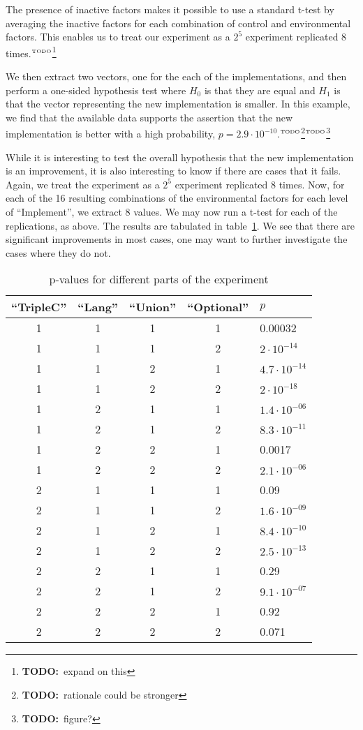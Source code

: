 \documentclass{llncs}
\newcommand{\todo}[1]{\ensuremath{^{\textrm{\tiny{TODO}\normalsize}}}\footnote{\textbf{TODO:}~#1}}
\begin{document}
The presence of inactive factors makes it possible to use a standard
t-test by averaging the inactive factors for each combination of
control and environmental factors. This enables us to treat our
experiment as a $2^5$ experiment replicated 8 times.\todo{expand on this}

We then extract two vectors, one for the each of the implementations,
and then perform a one-sided hypothesis test where $H_0$ is that they
are equal and $H_1$ is that the vector representing the new
implementation is smaller. In this example, we find that the available
data supports the assertion that the new implementation is better with a
high probability, $p=2.9 \cdot 10^{-10}$.\todo{rationale could be
  stronger}\todo{figure?}

While it is interesting to test the overall hypothesis that the new
implementation is an improvement, it is also interesting to know if
there are cases that it fails. Again, we treat the experiment as a
$2^5$ experiment replicated 8 times. Now, for each of the 16 resulting
combinations of the environmental factors for each level of
``Implement'', we extract 8 values. We may now run a t-test for each
of the replications, as above. The results are tabulated in
table~\ref{tab:pvaluesfull}. We see that there are significant
improvements in most cases, one may want to further investigate the
cases where they do not.

\begin{table}[ht]
\begin{center}
\caption{p-values for different parts of the experiment}\label{tab:pvaluesfull}
\begin{tabular}{ccccl}
  \hline
``TripleC'' & ``Lang'' & ``Union'' & ``Optional'' & $p$ \\ 
  \hline
  1 & 1 & 1 & 1 & 0.00032 \\ 
  1 & 1 & 1 & 2 & $2 \cdot 10^{-14}$ \\ 
  1 & 1 & 2 & 1 & $4.7 \cdot 10^{-14}$ \\ 
  1 & 1 & 2 & 2 & $2 \cdot 10^{-18}$ \\ 
  1 & 2 & 1 & 1 & $1.4 \cdot 10^{-06}$ \\ 
  1 & 2 & 1 & 2 & $8.3 \cdot 10^{-11}$ \\ 
  1 & 2 & 2 & 1 & 0.0017 \\ 
  1 & 2 & 2 & 2 & $2.1 \cdot 10^{-06}$ \\ 
  2 & 1 & 1 & 1 & 0.09 \\ 
  2 & 1 & 1 & 2 & $1.6 \cdot 10^{-09}$ \\ 
  2 & 1 & 2 & 1 & $8.4 \cdot 10^{-10}$ \\ 
  2 & 1 & 2 & 2 & $2.5 \cdot 10^{-13}$ \\ 
  2 & 2 & 1 & 1 & 0.29 \\ 
  2 & 2 & 1 & 2 & $9.1 \cdot 10^{-07}$ \\ 
  2 & 2 & 2 & 1 & 0.92 \\ 
  2 & 2 & 2 & 2 & 0.071 \\ 
   \hline
\end{tabular}
\end{center}
\end{table}
\end{document}
